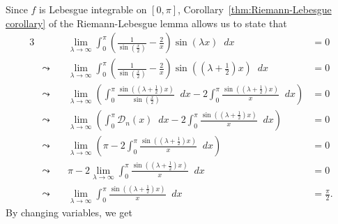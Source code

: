 \documentclass[a4paper]{article}
\newcommand*\diff{\mathop{}\!d} %
\theoremstyle{definition}
\begin{document}
Since $f$ is Lebesgue integrable on $[0, \pi]$, Corollary~\ref{thm:Riemann-Lebesgue corollary} of the Riemann-Lebesgue lemma allows us to state that
\begin{alignat*}{3}
     &                & \lim_{\lambda \to \infty} \int_{0}^{\pi} \left(\frac{1}{\sin\left(\frac{x}{2}\right)} - \frac{2}{x}\right) \sin(\lambda x) \diff x                                                                                                                    & = 0              \\
     & \leadsto \quad & \lim_{\lambda \to \infty} \int_{0}^{\pi} \left(\frac{1}{\sin\left(\frac{x}{2}\right)} - \frac{2}{x}\right) \sin\left(\left(\lambda  + \frac{1}{2}\right)x\right) \diff x                                                                              & = 0              \\
     & \leadsto \quad & \lim_{\lambda \to \infty} \left( \int_{0}^{\pi} \frac{\sin\left(\left(\lambda  + \frac{1}{2}\right)x\right)}{\sin\left(\frac{x}{2}\right)} \diff x - 2 \int_{0}^{\pi} \frac{\sin\left(\left(\lambda  + \frac{1}{2}\right)x\right)}{x} \diff x \right) & = 0              \\
     & \leadsto \quad & \lim_{\lambda \to \infty} \left( \int_{0}^{\pi} \mathcal{D}_n(x) \diff x - 2 \int_{0}^{\pi} \frac{\sin\left(\left(\lambda  + \frac{1}{2}\right)x\right)}{x} \diff x \right)                                                                           & = 0              \\
     & \leadsto \quad & \lim_{\lambda \to \infty} \left( \pi - 2 \int_{0}^{\pi} \frac{\sin\left(\left(\lambda  + \frac{1}{2}\right)x\right)}{x} \diff x \right)                                                                                                               & = 0              \\
     & \leadsto \quad & \pi - 2 \lim_{\lambda \to \infty} \int_{0}^{\pi} \frac{\sin\left(\left(\lambda  + \frac{1}{2}\right)x\right)}{x} \diff x                                                                                                                              & = 0              \\
     & \leadsto \quad & \lim_{\lambda \to \infty} \int_{0}^{\pi} \frac{\sin\left(\left(\lambda  + \frac{1}{2}\right)x\right)}{x} \diff x                                                                                                                                      & = \frac{\pi}{2}.
\end{alignat*}
By changing variables, we get
\end{document}
